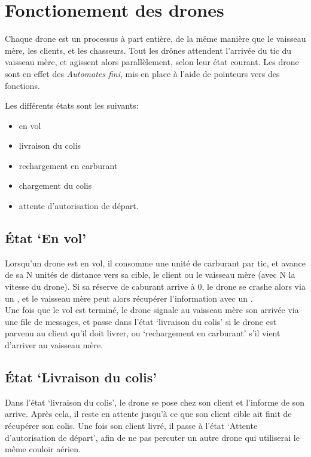 \section{Fonctionement des drones}

Chaque drone est un processus à part entière, de la même manière que le vaisseau mère, les clients, et les chasseurs.
Tout les drônes attendent l'arrivée du tic du vaisseau mère, et agissent alors parallèlement, selon leur état courant.
Les drone sont en effet des \emph{Automates fini}, mis en place à l'aide de pointeurs vers des fonctions.

Les différents états sont les suivants:
\begin{itemize}
    \item en vol
    \item livraison du colis
    \item rechargement en carburant
    \item chargement du colis
    \item attente d'autorisation de départ.
\end{itemize}

\subsection{État `En vol'}
    Lorsqu'un drone est en vol, il consomme une unité de carburant par tic, et avance de sa N unités de distance vers sa cible,
    le client ou le vaisseau mère (avec N la vitesse du drone).
    Si sa réserve de caburant arrive à \(0\), le drone se crashe alors via un ,
    et le vaisseau mère peut alors récupérer l'information avec un . \\
    Une fois que le vol est terminé, le drone signale au vaisseau mère son arrivée via une file de messages,
    et passe dans l'état `livraison du colis' si le drone est parvenu au client qu'il doit livrer,
    ou `rechargement en carburant' s'il vient d'arriver au vaisseau mère.

\subsection{État `Livraison du colis'}
    Dans l'état `livraison du colis', le drone se pose chez son client et l'informe de son arrive.
    Après cela, il reste en attente jusqu'à ce que son client cible ait finit de récupérer son colis.
    Une fois son client livré, il passe à l'état `Attente d'autorisation de départ', afin de ne pas
    percuter un autre drone qui utiliserai le même couloir aérien.

